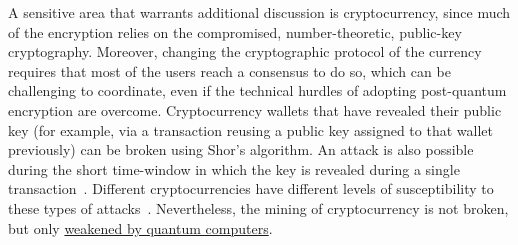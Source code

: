 \begin{refsection}
A sensitive area that warrants additional discussion is cryptocurrency, since much of the encryption relies on the compromised, number-theoretic, public-key cryptography. Moreover, changing the cryptographic protocol of the currency requires that most of the users reach a consensus to do so, which can be challenging to coordinate, even if the technical hurdles of adopting post-quantum encryption are overcome. Cryptocurrency wallets that have revealed their public key (for example, via a transaction reusing a public key assigned to that wallet previously) can be broken using Shor's algorithm. An attack is also possible during the short time-window in which the key is revealed during a single transaction~\cite{aggarwal2018QuantumAttacksBitcoin}. Different cryptocurrencies have different levels of susceptibility to these types of attacks~\cite{deloitte2019Bitcoin, deloitte2022ethereum}. Nevertheless, the mining of cryptocurrency is not broken, but only \hyperref[appl:WeakeningCrypto]{weakened by quantum computers}.

\printbibliography[heading=secbib,segment=\therefsegment]
\end{refsection}

\newpage



